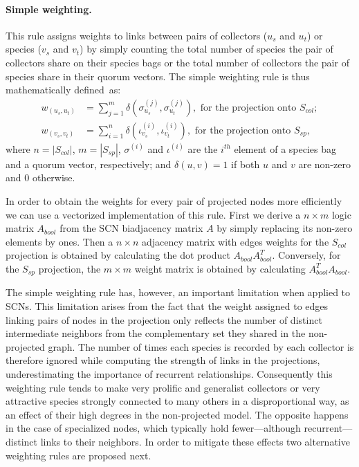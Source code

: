 {\paragraph*{Simple weighting.}
This rule assigns weights to links between pairs of collectors ($u_s$ and $u_t$) or species ($v_s$ and $v_t$) by simply counting the total number of species the pair of collectors share on their species bags or the total number of collectors the pair of species share in their quorum vectors. The simple weighting rule is thus mathematically defined~as:
\begin{equation} \label{eq:simple_weighting}
\begin{split}
w_{(u_s, u_t)} &= \sum_{j=1}^{m} \delta(\sigma^{(j)}_{u_s}, \sigma^{(j)}_{u_t}),\mbox{ for the projection onto }S_{col};\\
w_{(v_s, v_t)} &= \sum_{i=1}^{n} \delta(\iota^{(i)}_{v_s}, \iota^{(i)}_{v_t}),
\mbox{ for the projection onto }S_{sp},
\end{split}
\end{equation}
where $n = |S_{col}|$, $m = |S_{sp}|$, $\sigma^{(i)}$ and $\iota^{(i)}$ are the $i^{th}$ element of a species bag and a quorum vector, respectively; and $\delta(u,v)=1$ if both $u$ and $v$ are non-zero and $0$ otherwise.

In order to obtain the weights for every pair of projected nodes more efficiently we can use a vectorized implementation of this rule. First we derive a $n\times m$ logic matrix $A_{bool}$ from the SCN biadjacency matrix $A$ by simply replacing its non-zero elements by ones. 
Then a $n \times n$ adjacency matrix with edges weights for the $S_{col}$ projection is obtained by calculating the dot product $A_{bool} A_{bool}^T$.
Conversely, for the $S_{sp}$ projection, the $m \times m$ weight matrix is obtained by calculating $A_{bool}^T A_{bool}$.

The simple weighting rule has, however, an important limitation when applied to SCNs.
This limitation arises from the fact that the weight assigned to edges linking pairs of nodes in the projection only reflects the number of distinct intermediate neighbors from the complementary set they shared in the non-projected graph. The number of times each species is recorded by each collector is therefore ignored while computing the strength of links in the projections, underestimating the importance of recurrent relationships.
Consequently this weighting rule tends to make very prolific and generalist collectors or very attractive species strongly connected to many others in a disproportional way, as an effect of their high degrees in the non-projected model. The opposite happens in the case of specialized nodes, which typically hold fewer---although recurrent---distinct links to their neighbors. 
In order to mitigate these effects two alternative weighting rules are proposed next.

}
